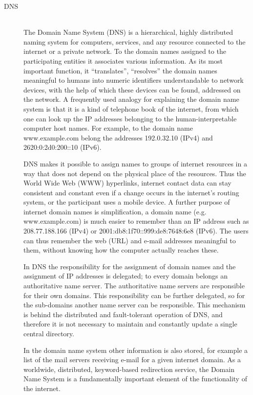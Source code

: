 \documentclass[margin=0px]{article}
\begin{document}
\begin{description}
    \item[DNS] \hfill \\
        The Domain Name System (DNS) is a hierarchical, highly distributed naming system for computers, services, and any resource connected to the internet or a private network. To the domain names assigned to the participating entities it associates various information. As its most important function, it ``translates'', ``resolves'' the domain names meaningful to humans into numeric identifiers understandable to network devices, with the help of which these devices can be found, addressed on the network.
        A frequently used analogy for explaining the domain name system is that it is a kind of telephone book of the internet, from which one can look up the IP addresses belonging to the human-interpretable computer host names. For example, to the domain name www.example.com belong the addresses 192.0.32.10 (IPv4) and 2620:0:2d0:200::10 (IPv6).

        DNS makes it possible to assign names to groups of internet resources in a way that does not depend on the physical place of the resources. Thus the World Wide Web (WWW) hyperlinks, internet contact data can stay consistent and constant even if a change occurs in the internet's routing system, or the participant uses a mobile device. A further purpose of internet domain names is simplification, a domain name (e.g. www.example.com) is much easier to remember than an IP address such as 208.77.188.166 (IPv4) or 2001:db8:1f70::999:de8:7648:6e8 (IPv6). The users can thus remember the web (URL) and e-mail addresses meaningful to them, without knowing how the computer actually reaches these.

        In DNS the responsibility for the assignment of domain names and the assignment of IP addresses is delegated; to every domain belongs an authoritative name server. The authoritative name servers are responsible for their own domains. This responsibility can be further delegated, so for the sub-domains another name server can be responsible. This mechanism is behind the distributed and fault-tolerant operation of DNS, and therefore it is not necessary to maintain and constantly update a single central directory.

        In the domain name system other information is also stored, for example a list of the mail servers receiving e-mail for a given internet domain. As a worldwide, distributed, keyword-based redirection service, the Domain Name System is a fundamentally important element of the functionality of the internet.


\end{description}
\end{document}
